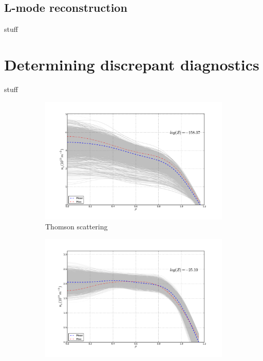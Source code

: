 \documentclass	[12pt]{article}
\begin{document}
\subsection{L-mode reconstruction}
stuff
\section{Determining discrepant diagnostics}
stuff
\begin{figure}[h!]
	\centering
	\begin{subfigure}[b]{0.5\textwidth}
		\centering
		\includegraphics[width=\textwidth,keepaspectratio=true]{figures/bfit146102_00505_thom5}
		\vspace{-30pt}
		\caption{Thomson scattering}
		\label{fig:ts505}
	\end{subfigure}
	\hspace{-20pt}
	\begin{subfigure}[b]{0.5\textwidth}
		\centering
		\includegraphics[width=\textwidth,keepaspectratio=true]{figures/bfit146102_00505_inter5}

\end{subfigure}
\end{figure}
\end{document}
